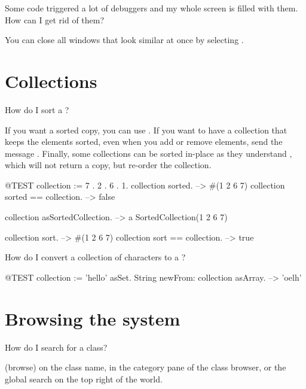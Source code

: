 \documentclass[a4paper,10pt,twoside]{book}
\begin{document}
\begin{faq}
Some code triggered a lot of debuggers and my whole screen is filled with them. 
How can I get rid of them?
\end{faq}
\answer
You can close all windows that look similar at once by selecting .

\section{Collections}

\begin{faq}
How do I sort a ?
\end{faq}
\answer
If you want a sorted copy, you can use . 
If you want to have a collection that keeps the elements sorted, even when you add or remove elements, send the message .
Finally, some collections can be sorted in-place as they understand , which will not return a copy, but re-order the collection.

\begin{code}{@TEST}
collection := {7 . 2 . 6 . 1}.
collection sorted. --> #(1 2 6 7)
collection sorted == collection. --> false

collection asSortedCollection. --> a SortedCollection(1 2 6 7)

collection sort. --> #(1 2 6 7)
collection sort == collection. --> true
\end{code}

\begin{faq}
How do I convert a collection of characters to a ?
\end{faq}
\answer
\begin{code}{@TEST}
collection := 'hello' asSet.
String newFrom: collection asArray. --> 'oelh'
\end{code}

\section{Browsing the system}

\begin{faq}
How do I search for a class?
\end{faq}
\answer
{} (browse) on the class name,  in the category pane of the class browser, or the global search on the top right of the world.
\end{document}
